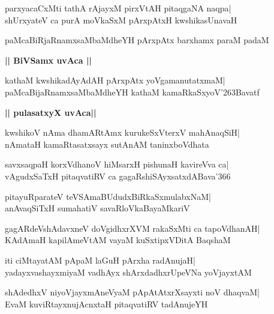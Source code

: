 \documentclass[twoside,12pt,openright]{book}
\def\S{\char'263}
\newcounter{shloka}[chapter]
\def\uvaca#1{\centerline{{\large\textbf{#1}}}}
\begin{document}
\begin{shloka}%
parxyacaCxMti tathA rAjayxM pirxVtAH pitaqgaNA naqpa|\\
shUrxyateV ca purA moVkaSxM pArxpAtxH kwshikasUnavaH
\end{shloka}

\begin{shloka}%
paMcaBiRjaRnamxsaMbaMdheYH pArxpAtx barxhamx paraM padaM
\end{shloka}

\uvaca{|| BiVSamx uvAca ||}
\begin{shloka}%
kathaM kwshikadAyAdAH pArxpAtx yoVgamanutatxmaM|\\
paMcaBijaRnamxsaMbaMdheYH kathaM kamaRkaSxyoV\S Bavatf
\end{shloka}

\uvaca{|| pulasatxyX uvAca||}
\begin{shloka}%
kwshikoV nAma dhamARtAmx kurukeSxVterxV mahAnaqSiH|\\
nAmataH kamaRtasatxsayx sutAnAM taninxboVdhata
\end{shloka}

\begin{shloka}%
savxsaqpaH korxVdhanoV hiMsarxH pishunaH kavireVva ca|\\
vAgudxSaTxH pitaqvatiRV ca gagaRshiSAyxsatxdABava\char'366
\end{shloka}

\begin{shloka}%
pitayuRparateV teVSAmaBUdudxBiRkaSxmulabxNaM|\\
anAvaqSiTxH sumahatiV savaRloVkaBayaMkariV
\end{shloka}

\begin{shloka}%
gagARdeVshAdavxneV doVgidhxrXVM rakaSxMti ca tapoVdhanAH|\\
KAdAmaH kapilAmeVtAM vayaM kuSxtipxVDitA BaqshaM
\end{shloka}

\begin{shloka}%
iti ciMtayatAM pApaM laGuH pArxha radAnujaH|\\
yadayxvashayxmiyaM vadhAyx shArxdadhxrUpeVNa yoVjayxtAM
\end{shloka}

\begin{shloka}%
shAdedhxV niyoVjayxmAneVyaM pApAtAtxrXsayxti noV dhaqvaM|\\
EvaM kuviRtayxnujAcnxtaH pitaqvatiRV tadAnujeYH
\end{shloka}
\end{document}
